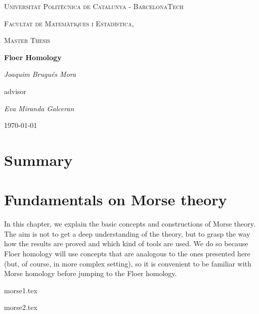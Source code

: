 \documentclass[a4paper,11pt]{book}
\theoremstyle{indented}
\begin{document}
\begin{titlepage}
	\centering
	{\scshape\LARGE Universitat Politècnica de Catalunya - BarcelonaTech\par}
	{\scshape\LARGE Facultat de Matemàtiques i Estadística, \par}
	\vspace{1cm}
	{\scshape\Large Master Thesis\par}
	\vspace{1.5cm}
	{\huge\bfseries Floer Homology\par}
	\vspace{2cm}
	{\Large\itshape Joaquim Brugués Mora\par}
	\vfill
	advisor\par
	{\Large\itshape Eva Miranda Galceran\par}

	\vfill

	{\large \today\par}
\end{titlepage}


\chapter*{Summary}


\tableofcontents

\mainmatter

\chapter{Fundamentals on Morse theory}
In this chapter, we explain the basic concepts and constructions of Morse theory. The aim is not to get a deep understanding of the theory, but to grasp the way how the results are proved and which kind of tools are used. We do so because Floer homology will use concepts that are analogous to the ones presented here (but, of course, in more complex setting), so it is convenient to be familiar with Morse homology before jumping to the Floer homology.

{morse1.tex}

 {morse2.tex}

\end{document}
